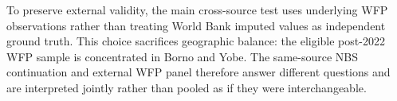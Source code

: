 To preserve external validity, the main cross-source test uses
underlying WFP observations rather than treating World Bank imputed
values as independent ground truth. This choice sacrifices geographic
balance: the eligible post-2022 WFP sample is concentrated in Borno and
Yobe. The same-source NBS continuation and external WFP panel therefore
answer different questions and are interpreted jointly rather than
pooled as if they were interchangeable.
